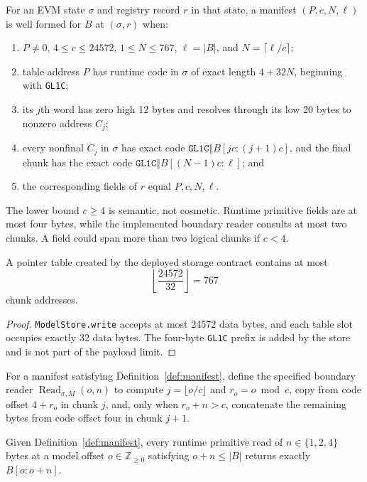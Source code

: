 \begin{definition}
\label{def:manifest}
For an EVM state $\sigma$ and registry record $r$ in that state, a manifest
$(P,c,N,\ell)$ is well formed for $B$ at $(\sigma,r)$ when:
\begin{enumerate}
  \item $P\ne0$, $4\le c\le24572$, $1\le N\le767$,
        $\ell=|B|$, and $N=\lceil\ell/c\rceil$;
  \item table address $P$ has runtime code in $\sigma$ of exact length $4+32N$, beginning
        with \texttt{GL1C};
  \item its $j$th word has zero high 12 bytes and resolves through its low
        20 bytes to nonzero address $C_j$;
  \item every nonfinal $C_j$ in $\sigma$ has exact code
        $\texttt{GL1C}\Vert B[jc:(j+1)c]$, and the final chunk has the exact
        code $\texttt{GL1C}\Vert B[(N-1)c:\ell]$; and
  \item the corresponding fields of $r$ equal $P,c,N,\ell$.
\end{enumerate}
\end{definition}

The lower bound $c\ge4$ is semantic, not cosmetic.  Runtime primitive fields
are at most four bytes, while the implemented boundary reader consults at most
two chunks.  A field could span more than two logical chunks if $c<4$.

\begin{lemma}
\label{lem:pointer-capacity}
A pointer table created by the deployed storage contract contains at most
\[
  \left\lfloor \frac{24572}{32}\right\rfloor=767
\]
chunk addresses.
\end{lemma}

\begin{proof}
\texttt{ModelStore.write} accepts at most 24572 data bytes, and each table slot
occupies exactly 32 data bytes.  The four-byte \texttt{GL1C} prefix is added by
the store and is not part of the payload limit.
\end{proof}

For a manifest satisfying Definition~\ref{def:manifest}, define the specified
boundary reader $\operatorname{Read}_{\sigma,M}(o,n)$ to compute
$j=\lfloor o/c\rfloor$ and $r_o=o\bmod c$, copy from code offset $4+r_o$ in
chunk $j$, and, only when $r_o+n>c$, concatenate the remaining bytes from code
offset four in chunk $j+1$.

\begin{lemma}
\label{lem:reconstruction}
Given Definition~\ref{def:manifest}, every runtime primitive read of
$n\in\{1,2,4\}$ bytes at a model offset $o\in\mathbb Z_{\ge0}$ satisfying
$o+n\le |B|$ returns exactly $B[o:o+n]$.
\end{lemma}

